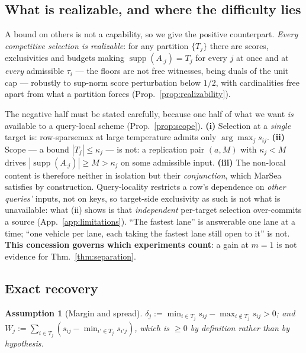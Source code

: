 \documentclass{article}
\newtheorem{assumption}{Assumption}
\newcommand{\supp}{\operatorname{supp}}
\begin{document}
\subsection{What is realizable, and where the difficulty lies}
\label{sec:competitive}

A bound on others is not a capability, so we give the positive counterpart. \emph{Every
competitive selection is realizable}: for any partition $\{T_j\}$ there are scores, exclusivities
and budgets making $\supp(A_{\cdot j})=T_j$ for every $j$ at once and at \emph{every} admissible
$\tau_i$ --- the floors are not free witnesses, being duals of the unit cap --- robustly to
sup-norm score perturbation below $1/2$, with cardinalities free apart from what a partition
forces (Prop.~\ref{prop:realizability}).

The negative half must be stated carefully, because one half of what we want \emph{is} available
to a query-local scheme (Prop.~\ref{prop:scope}). \textbf{(i)} Selection
at a \emph{single} target is: row-sparsemax at large temperature admits only $\arg\max_j s_{ij}$.
\textbf{(ii)} Scope --- a bound $|T_j|\le\kappa_j$ --- is not: a replication pair $(a,M)$ with
$\kappa_j<M$ drives $|\supp(A_{\cdot j})|\ge M>\kappa_j$ on some admissible input. \textbf{(iii)} The non-local content is
therefore neither in isolation but their \emph{conjunction}, which MarSea satisfies by
construction. Query-locality restricts a row's dependence on \emph{other queries'} inputs, not on
keys, so target-side exclusivity as such is not what is unavailable: what (ii) shows is that
\emph{independent} per-target selection over-commits a source
(App.~\ref{app:limitations}). ``The fastest lane'' is answerable one lane at a time; ``one vehicle per lane,
each taking the fastest lane still open to it'' is not. \textbf{This concession governs which
experiments count}: a gain at $m=1$ is not evidence for Thm.~\ref{thm:separation}.

\subsection{Exact recovery}
\label{sec:recovery}

\begin{assumption}[Margin and spread]
\label{ass:margin}
$\delta_j := \min_{i\in T_j}s_{ij} - \max_{i\notin T_j}s_{ij} > 0$; and
$W_j := \sum_{i\in T_j}(s_{ij}-\min_{i'\in T_j}s_{i'j})$, which is $\ge 0$ by definition rather
than by hypothesis.
\end{assumption}
\end{document}
